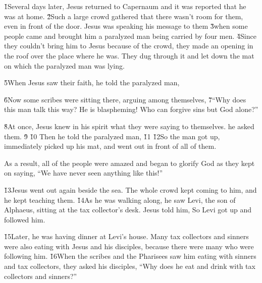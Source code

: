 \v{1}Several days later, Jesus returned to Capernaum and it was reported that he was at home. \v{2}Such a large crowd gathered that there wasn't room for them, even in front of the door. Jesus was speaking his message to them \v{3}when some people came and brought him a paralyzed man being carried by four men. \v{4}Since they couldn't bring him to Jesus because of the crowd, they made an opening in the roof over the place where he was. They dug through it and let down the mat on which the paralyzed man was lying.

\v{5}When Jesus saw their faith, he told the paralyzed man, 

\v{6}Now some scribes were sitting there, arguing among themselves, \v{7}``Why does this man talk this way? He is blaspheming! Who can forgive sins but God alone?''

\v{8}At once, Jesus knew in his spirit what they were saying to themselves.  he asked them. \v{9} \v{10} Then he told the paralyzed man, \v{11} \v{12}So the man got up, immediately picked up his mat, and went out in front of all of them.

As a result, all of the people were amazed and began to glorify God as they kept on saying, ``We have never seen anything like this!''

\v{13}Jesus went out again beside the sea. The whole crowd kept coming to him, and he kept teaching them. \v{14}As he was walking along, he saw Levi, the son of Alphaeus, sitting at the tax collector's desk. Jesus told him,  So Levi got up and followed him.

\v{15}Later, he was having dinner at Levi's house. Many tax collectors and sinners were also eating with Jesus and his disciples, because there were many who were following him. \v{16}When the scribes and the Pharisees saw him eating with sinners and tax collectors, they asked his disciples, ``Why does he eat and drink with tax collectors and sinners?''


